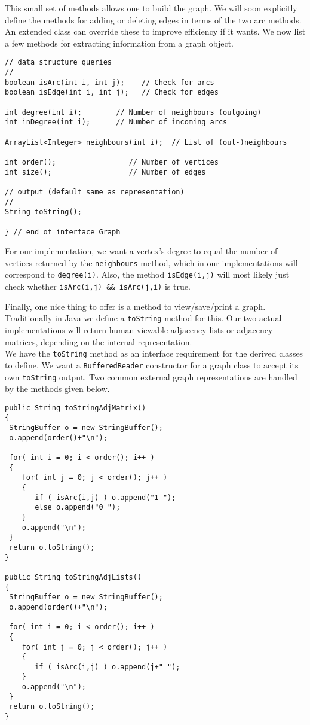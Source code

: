 This small set of methods allows one to build the graph.  We will soon
explicitly define the methods for adding or deleting edges in terms of
the two arc methods.  An extended class can override these to improve
efficiency if it wants.   We now list a few methods for extracting
information from a graph object.

{\renewcommand{\ttdefault}{pcr} %
\footnotesize \begin{verbatim}
// data structure queries
//
boolean isArc(int i, int j);    // Check for arcs
boolean isEdge(int i, int j);   // Check for edges

int degree(int i);        // Number of neighbours (outgoing)
int inDegree(int i);      // Number of incoming arcs

ArrayList<Integer> neighbours(int i);  // List of (out-)neighbours

int order();                 // Number of vertices
int size();                  // Number of edges

// output (default same as representation)
//
String toString();

} // end of interface Graph
\end{verbatim}%
}

For our implementation, we want a vertex's degree to equal the number of
vertices returned by the \verb|neighbours| method, which in our
implementations will correspond to \verb|degree(i)|.
Also, the method \verb|isEdge(i,j)| will most likely just check
whether \verb|isArc(i,j) && isArc(j,i)| is true.

Finally, one nice thing to offer is a method to view/save/print a graph. 
Traditionally in Java we define a \verb|toString| method for this.
Our two actual implementations will return human viewable adjacency
lists or adjacency matrices, depending on the internal representation.\\

We have the \verb|toString| method
as an interface requirement for the derived classes to define.   We want a
\verb|BufferedReader| constructor for a graph class to accept its own
\verb|toString| output. Two common external graph representations
are handled by the methods given below.

\label{graphoutput}
{\renewcommand{\ttdefault}{pcr} %
\footnotesize \begin{verbatim}
public String toStringAdjMatrix()
{
 StringBuffer o = new StringBuffer();
 o.append(order()+"\n");

 for( int i = 0; i < order(); i++ )
 {
    for( int j = 0; j < order(); j++ )
    {
       if ( isArc(i,j) ) o.append("1 ");
       else o.append("0 ");
    }
    o.append("\n");
 }
 return o.toString();
}

public String toStringAdjLists()
{
 StringBuffer o = new StringBuffer();
 o.append(order()+"\n");

 for( int i = 0; i < order(); i++ )
 {
    for( int j = 0; j < order(); j++ )
    {
       if ( isArc(i,j) ) o.append(j+" ");
    }
    o.append("\n");
 }
 return o.toString();
}
\end{verbatim}%
}

